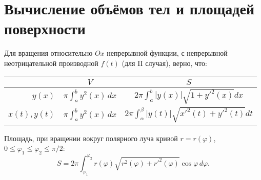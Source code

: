 \section*{Вычисление объёмов тел и площадей поверхности}

Для вращения относительно $Ox$ непрерывной функции, с непрерывной неотрицательной производной $f(t)$ (для II случая), верно, что:

\begin{table}[h]
    \centering
        \begin{tabular}{r|c|c}
            & \centering $V$ & $S$ \\
    \midrule
            $y(x)$ \phantom{$\dfrac{1}{2}$}
            & $\pi \int_a^b y^2 (x) \, dx$
            & $2 \pi \int_a^b |y(x)| \sqrt{1 + y'^2 (x)} dx$\\
            $x(t), y(t)$ \phantom{$\dfrac{1}{2}$}
            & $\pi \int_a^b y^2 (x) \, dx$
            & $ 2 \pi \int_{\alpha}^{\beta} |y(t)| \sqrt{x'^2(t) + y'^2(t)} dt$  \\
        \end{tabular}
\end{table}

Площадь, при вращении вокруг полярного луча кривой $r = r(\varphi)$, $0 \leqslant \varphi_1 \leqslant \varphi_2 \leqslant \pi/2$:
$$
S = 2 \pi \int_{\varphi_1}^{\varphi_2} r(\varphi) \sqrt{r^2(\varphi) + r'^2(\varphi)} \cos{\varphi} \, d \varphi.
$$